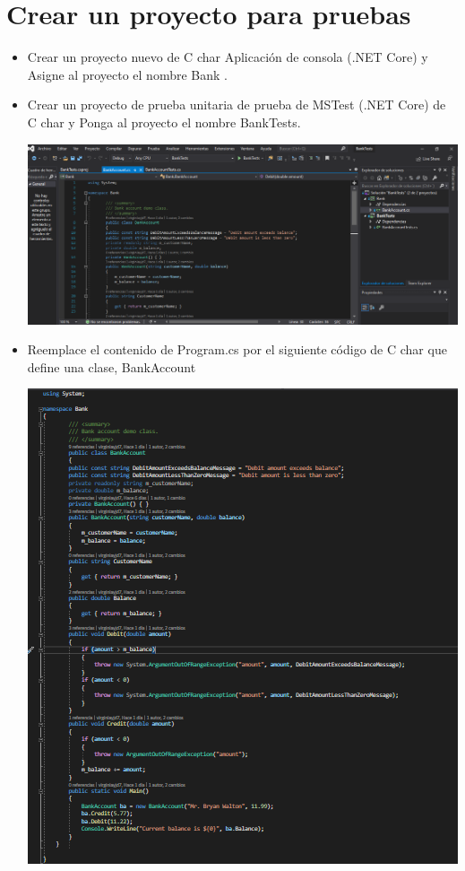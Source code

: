 \section{Crear un proyecto para pruebas} 
\begin{itemize}
 \item  Crear un proyecto nuevo de C char Aplicación de consola (.NET Core) y Asigne al proyecto el nombre Bank .
\item Crear un proyecto de prueba unitaria  de prueba de MSTest (.NET Core) de C char y  Ponga al proyecto el nombre BankTests.

\begin{center}
\includegraphics[width=\columnwidth]{images/1}\newline
\end{center}
\item Reemplace el contenido de Program.cs por el siguiente código de C char que define una
clase, BankAccount
\begin{center}
\includegraphics[width=\columnwidth]{images/2}\newline

\end{center}
\end{itemize}
